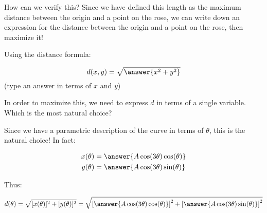 \documentclass{ximera}
\begin{document}
\begin{exercise}
\begin{exercise}
\begin{exercise}
How can we verify this?  Since we have defined this length as the maximum distance between the origin and a point on the rose, we can write down an expression for the distance between the origin and a point on the rose, then maximize it!

\begin{image}  
\end{image} 


Using the distance formula:

\[
d(x,y) = \sqrt{\answer{x^2+y^2}}
\]
(type an answer in terms of $x$ and $y$)

In order to maximize this, we need to express $d$ in terms of a single variable.  Which is the most natural choice?

\begin{multipleChoice}
\choice[correct]{$\theta$}
\end{multipleChoice}
Since we have a parametric description of the curve in terms of $\theta$, this is the natural choice! In fact:

\begin{align*}
x(\theta) &= \answer{A\cos(3\theta)\cos(\theta)} \\
y(\theta) &= \answer{A\cos(3\theta)\sin(\theta)}
\end{align*}

Thus:

\[
d(\theta) = \sqrt{[x(\theta)]^2+[y(\theta)]^2} = \sqrt{\left[\answer{A\cos(3\theta)\cos(\theta)}\right]^2+\left[ \answer{A\cos(3\theta)\sin(\theta)} \right]^2}
\]


\end{exercise}
\end{exercise}
\end{exercise}
\end{document}
